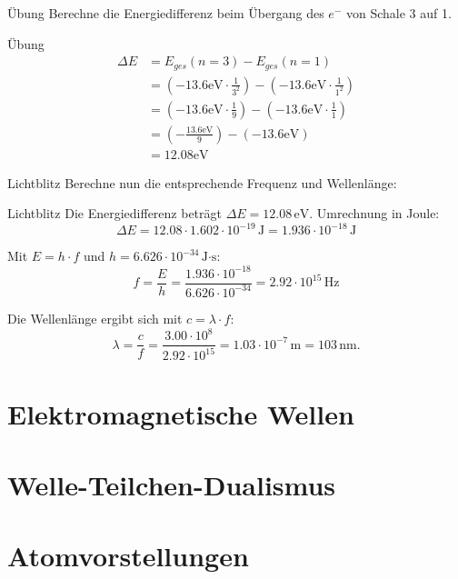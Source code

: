 \documentclass[11pt,a4paper,oneside]{article}
\begin{document}
	\newpage
	\begin{aufgabe}{Übung}
		Berechne die Energiedifferenz beim Übergang des $e^{-}$ von Schale 3 auf 1. 
	\end{aufgabe}
	
	\begin{loesung}{Übung}
		\begin{align*}
			\Delta E &= E_{ges} (n = 3) - E_{ges} (n = 1)\\
			&= \left( -13.6 \mathrm{eV} \cdot \frac{1}{3^2}\right) - \left( -13.6 \mathrm{eV} \cdot \frac{1}{1^2}\right)\\ 
			&= \left( -13.6 \mathrm{eV} \cdot \frac{1}{9}\right) - \left( -13.6 \mathrm{eV} \cdot \frac{1}{1}\right)\\ 
			&= \left( - \frac{13.6 \mathrm{eV}}{9}\right) - \left( - 13.6 \mathrm{eV} \right)\\
			&= 12.08 \mathrm{eV}
		\end{align*}
	\end{loesung}
	
	\begin{aufgabe}{Lichtblitz}
		Berechne nun die entsprechende Frequenz und Wellenlänge: 
	\end{aufgabe}
	
	\begin{loesung}{Lichtblitz}
		Die Energiedifferenz beträgt $\Delta E = 12.08\,\text{eV}$.  
		Umrechnung in Joule:
		\[
		\Delta E = 12.08 \cdot 1.602 \cdot 10^{-19}\,\text{J}
		= 1.936 \cdot 10^{-18}\,\text{J}
		\]
		
		Mit $E = h \cdot f$ und $h = 6.626 \cdot 10^{-34}\,\text{J·s}$:
		\[
		f = \frac{E}{h} = \frac{1.936 \cdot 10^{-18}}{6.626 \cdot 10^{-34}}
		= 2.92 \cdot 10^{15}\,\text{Hz}
		\]
		
		Die Wellenlänge ergibt sich mit $c = \lambda \cdot f$:
		\[
		\lambda = \frac{c}{f} = \frac{3.00 \cdot 10^8}{2.92 \cdot 10^{15}}
		= 1.03 \cdot 10^{-7}\,\text{m} = 103\,\text{nm}.
		\]
	\end{loesung}
	
	\newpage
	
	\section{Elektromagnetische Wellen}

	\section{Welle-Teilchen-Dualismus}
	\section{Atomvorstellungen}
	
\end{document}
